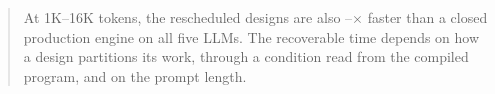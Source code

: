 \begin{abstract}
At 1K--16K tokens, the rescheduled designs are also \AbsGainLo--\AbsGainHi$\times$ faster than a closed production engine on all five LLMs.
The recoverable time depends on how a design partitions its work, through a condition read from the compiled program, and on the prompt length.

\end{abstract}

